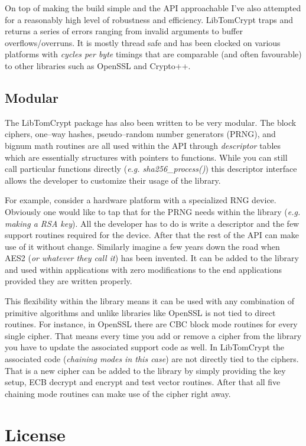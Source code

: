 \documentclass[synpaper]{book}
\newcommand{\mysection}[1]    %
	{                   %
	\section{#1}
   \markboth{\textsf{www.libtom.org}}{\thesection ~ {#1}}
	}
\begin{document}
On top of making the build simple and the API approachable I've also attempted for a reasonably high level of
robustness and efficiency.  LibTomCrypt traps and returns a series of errors ranging from invalid
arguments to buffer overflows/overruns.  It is mostly thread safe and has been clocked on various platforms
with \textit{cycles per byte} timings that are comparable (and often favourable) to other libraries such as OpenSSL and
Crypto++.

\subsection{Modular}
The LibTomCrypt package has also been written to be very modular.  The block ciphers, one--way hashes,
pseudo--random number generators (PRNG), and bignum math routines are all used within the API through \textit{descriptor} tables which 
are essentially structures with pointers to functions.  While you can still call particular functions
directly (\textit{e.g. sha256\_process()}) this descriptor interface allows the developer to customize their
usage of the library.

For example, consider a hardware platform with a specialized RNG device.  Obviously one would like to tap
that for the PRNG needs within the library (\textit{e.g. making a RSA key}).  All the developer has to do
is write a descriptor and the few support routines required for the device.  After that the rest of the 
API can make use of it without change.  Similarly imagine a few years down the road when AES2 
(\textit{or whatever they call it}) has been invented.  It can be added to the library and used within applications 
with zero modifications to the end applications provided they are written properly.

This flexibility within the library means it can be used with any combination of primitive algorithms and 
unlike libraries like OpenSSL is not tied to direct routines.  For instance, in OpenSSL there are CBC block
mode routines for every single cipher.  That means every time you add or remove a cipher from the library
you have to update the associated support code as well.  In LibTomCrypt the associated code (\textit{chaining modes in this case})
are not directly tied to the ciphers.  That is a new cipher can be added to the library by simply providing 
the key setup, ECB decrypt and encrypt and test vector routines.  After that all five chaining mode routines
can make use of the cipher right away.

\mysection{License}
\end{document}
